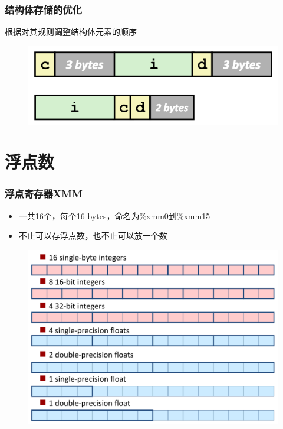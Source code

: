\documentclass[12pt,AutoFakeBold,aspectratio=169,mathserif]{beamer}
\begin{document}
    \begin{frame}
        \frametitle{结构体存储的优化}
    
        根据对其规则调整结构体元素的顺序

        \begin{figure}
            \includegraphics[width=.618\textwidth]{figures/small.png}
        \end{figure}

    
    \end{frame}

    \section{浮点数}

    \begin{frame}
        \frametitle{浮点寄存器XMM}
    
        \begin{itemize}
            \item 一共16个，每个16 bytes，命名为\%xmm0到\%xmm15
            \item 不止可以存浮点数，也不止可以放一个数
        \end{itemize}

        \begin{figure}
            \includegraphics[height=.6\paperheight]{figures/xmm.png}
        \end{figure}
    
    \end{frame}
\end{document}
